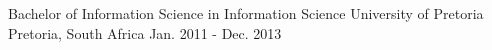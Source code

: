   \begin{cventries}
    \cventry{}{}{}{}{}

    \cventry
      {Bachelor of Information Science in Information Science}
      {University of Pretoria}
      {Pretoria, South Africa}
      {Jan. 2011 - Dec. 2013}
      {}
  \end{cventries}